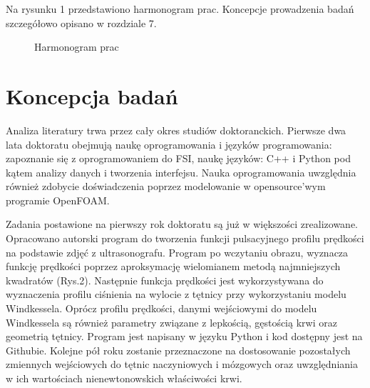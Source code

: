 \documentclass[11pt]{article} %
\begin{document}
Na rysunku 1 przedstawiono harmonogram prac. Koncepcje prowadzenia badań szczegółowo opisano w rozdziale 7. 

\begin{figure}[H] 
\caption{Harmonogram prac}
\label{fig:speciation}
\end{figure}


\section{Koncepcja badań}

Analiza literatury trwa przez cały okres studiów doktoranckich. Pierwsze dwa lata doktoratu obejmują naukę oprogramowania i języków programowania: zapoznanie się z oprogramowaniem do FSI, naukę języków: C++ i Python pod kątem analizy danych i tworzenia interfejsu. Nauka oprogramowania uwzględnia również zdobycie doświadczenia poprzez modelowanie w opensource’wym programie OpenFOAM. 


Zadania postawione na pierwszy rok doktoratu są już w większości zrealizowane. Opracowano autorski program do tworzenia funkcji pulsacyjnego profilu prędkości na podstawie zdjęć z ultrasonografu. Program po wczytaniu obrazu, wyznacza funkcję prędkości poprzez aproksymację wielomianem metodą najmniejszych kwadratów (Rys.2). Następnie funkcja prędkości jest wykorzystywana do wyznaczenia profilu ciśnienia na wylocie z tętnicy przy wykorzystaniu modelu Windkessela. Oprócz profilu prędkości, danymi wejściowymi do modelu Windkessela są również parametry związane z lepkością, gęstością krwi oraz geometrią tętnicy. Program jest napisany w języku Python i kod dostępny jest na Githubie. Kolejne pół roku zostanie przeznaczone na dostosowanie pozostałych zmiennych wejściowych do tętnic naczyniowych i mózgowych oraz uwzględniania w ich wartościach nienewtonowskich właściwości krwi.
\end{document}
